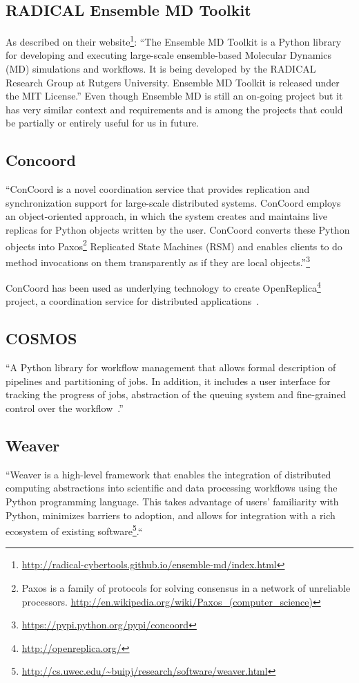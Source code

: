\subsection{RADICAL Ensemble MD Toolkit}
As described on their website\footnote{\url{http://radical-cybertools.github.io/ensemble-md/index.html}}:
``The Ensemble MD Toolkit is a Python library for developing and executing large-scale ensemble-based
Molecular Dynamics (MD) simulations and workflows. It is being developed by the RADICAL Research
Group at Rutgers University. Ensemble MD Toolkit is released under the MIT License.''
Even though Ensemble MD is still an on-going project but it has very similar context and requirements 
and is among the projects that could be partially or entirely useful for us in future.

\subsection{Concoord}
``ConCoord is a novel coordination service that provides replication and synchronization 
support for large-scale distributed systems. ConCoord employs an object-oriented approach, 
in which the system creates and maintains live replicas for Python objects written by the user. 
ConCoord converts these Python objects into Paxos\footnote{Paxos is a family of protocols for solving 
consensus in a network of unreliable processors. \url{http://en.wikipedia.org/wiki/Paxos_(computer_science)}}
Replicated State Machines (RSM) and enables clients
to do method invocations on them transparently as if they are local objects.''\footnote{\url{https://pypi.python.org/pypi/concoord}}

ConCoord has been used as underlying technology to create OpenReplica\footnote{\url{http://openreplica.org/}} project, 
a coordination service for distributed applications~\cite{altinbuken2012commodifying}.

\subsection{COSMOS}
``A Python library for workflow
management that allows formal description of pipelines and partitioning of jobs. 
In addition, it includes a user interface for tracking the
progress of jobs, abstraction of the queuing system and fine-grained
control over the workflow~\cite{Gafni30062014}.''

\subsection{Weaver}
``Weaver\cite{Bui_weaver:integrating} is a high-level framework that enables the integration of distributed computing abstractions
into scientific and data processing workflows using the Python programming language. 
This takes advantage of users' familiarity with Python, minimizes barriers to adoption, 
and allows for integration with a rich ecosystem of existing 
software\footnote{\url{http://cs.uwec.edu/~buipj/research/software/weaver.html}}.``

